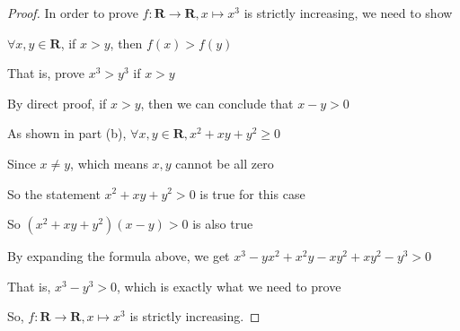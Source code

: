 \documentclass[12pt]{article}
\begin{document}
\vspace*{0.3cm}
\begin{proof}

    In order to prove $ f : \mathbf{R} \longrightarrow \mathbf{R},
     x \mapsto x^3 $ is strictly increasing, we need to show

    \vspace*{0.3cm}
    \hspace*{1.2cm}
    $ \forall x,y \in \mathbf{R}$, if $x>y$, then $f(x) > f(y)$

    \vspace*{0.3cm}
    \hspace*{1.2cm}
    That is, prove $x^3 > y^3$ if $x > y$

    \vspace*{0.3cm}
    \hspace*{1.2cm}
    By direct proof, if $x>y$, then we can conclude that $x-y > 0$

    \vspace*{0.3cm}
    \hspace*{1.2cm}
    As shown in part (b), $\forall x,y \in \mathbf{R}, x^2 + xy + y^2 \geq 0 $

    \vspace*{0.3cm}
    \hspace*{1.2cm}
    Since $x \neq y$, which means $x,y$ cannot be all zero

    \vspace*{0.3cm}
    \hspace*{1.2cm}
    So the statement $ x^2 + xy + y^2 >0$ is true for this case

    \vspace*{0.3cm}
    \hspace*{1.2cm}
    So $ (x^2 + xy + y^2)(x-y) > 0$ is also true

    \vspace*{0.3cm}
    \hspace*{1.2cm}
    By expanding the formula above, we get $ x^3 - yx^2+x^2y-xy^2+xy^2-y^3 > 0 $

    \vspace*{0.3cm}
    \hspace*{1.2cm}
    That is, $ x^3 - y^3 > 0 $, which is exactly what we need to prove

    \vspace*{0.3cm}
    \hspace*{1.2cm}
    So, $ f : \mathbf{R} \longrightarrow \mathbf{R},
     x \mapsto x^3 $ is strictly increasing.

\end{proof}
\end{document}
